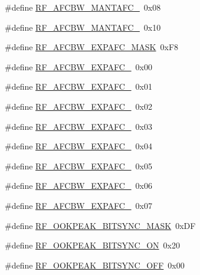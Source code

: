 \begin{DoxyCompactItemize}
\item 
\#define \hyperlink{sx1276Regs-Fsk_8h_aac631ae8fd6d24284d6624ef2c32f0ec}{R\+F\+\_\+\+A\+F\+C\+B\+W\+\_\+\+M\+A\+N\+T\+A\+F\+C\+\_}~0x08
\item 
\#define \hyperlink{sx1276Regs-Fsk_8h_a0fa0fc9612a4b48114ed43fb4e2e95b4}{R\+F\+\_\+\+A\+F\+C\+B\+W\+\_\+\+M\+A\+N\+T\+A\+F\+C\+\_}~0x10
\item 
\#define \hyperlink{sx1276Regs-Fsk_8h_a73aab542bba68b65d6e6e529a6e502c1}{R\+F\+\_\+\+A\+F\+C\+B\+W\+\_\+\+E\+X\+P\+A\+F\+C\+\_\+\+M\+A\+SK}~0x\+F8
\item 
\#define \hyperlink{sx1276Regs-Fsk_8h_a8cc2a4a34787108b59e150f19a27c9a6}{R\+F\+\_\+\+A\+F\+C\+B\+W\+\_\+\+E\+X\+P\+A\+F\+C\+\_}~0x00
\item 
\#define \hyperlink{sx1276Regs-Fsk_8h_afe3cf2aebd859024337d286c1ab68f6a}{R\+F\+\_\+\+A\+F\+C\+B\+W\+\_\+\+E\+X\+P\+A\+F\+C\+\_}~0x01
\item 
\#define \hyperlink{sx1276Regs-Fsk_8h_a7b89d616e4ba9c65441deb101651f638}{R\+F\+\_\+\+A\+F\+C\+B\+W\+\_\+\+E\+X\+P\+A\+F\+C\+\_}~0x02
\item 
\#define \hyperlink{sx1276Regs-Fsk_8h_a93a930a33871216aaa3bc41a8bf2507b}{R\+F\+\_\+\+A\+F\+C\+B\+W\+\_\+\+E\+X\+P\+A\+F\+C\+\_}~0x03
\item 
\#define \hyperlink{sx1276Regs-Fsk_8h_a468c40d81d8271fa92a4331f4c3a6c74}{R\+F\+\_\+\+A\+F\+C\+B\+W\+\_\+\+E\+X\+P\+A\+F\+C\+\_}~0x04
\item 
\#define \hyperlink{sx1276Regs-Fsk_8h_a507cb037026ab04e1a1634a2ef8fa90b}{R\+F\+\_\+\+A\+F\+C\+B\+W\+\_\+\+E\+X\+P\+A\+F\+C\+\_}~0x05
\item 
\#define \hyperlink{sx1276Regs-Fsk_8h_a1ebab24d4f23c9430b1b65b670bf2b79}{R\+F\+\_\+\+A\+F\+C\+B\+W\+\_\+\+E\+X\+P\+A\+F\+C\+\_}~0x06
\item 
\#define \hyperlink{sx1276Regs-Fsk_8h_a99b0f60379ae9cf93b92a8108977cf1d}{R\+F\+\_\+\+A\+F\+C\+B\+W\+\_\+\+E\+X\+P\+A\+F\+C\+\_}~0x07
\item 
\#define \hyperlink{sx1276Regs-Fsk_8h_a07bd216fd11bb1522ddaaec499b1acc6}{R\+F\+\_\+\+O\+O\+K\+P\+E\+A\+K\+\_\+\+B\+I\+T\+S\+Y\+N\+C\+\_\+\+M\+A\+SK}~0x\+DF
\item 
\#define \hyperlink{sx1276Regs-Fsk_8h_a3069cb1326f97de4513e38c42efcf442}{R\+F\+\_\+\+O\+O\+K\+P\+E\+A\+K\+\_\+\+B\+I\+T\+S\+Y\+N\+C\+\_\+\+ON}~0x20
\item 
\#define \hyperlink{sx1276Regs-Fsk_8h_a46e977e1bee2a0285de1c083959c7bbf}{R\+F\+\_\+\+O\+O\+K\+P\+E\+A\+K\+\_\+\+B\+I\+T\+S\+Y\+N\+C\+\_\+\+O\+FF}~0x00

\end{DoxyCompactItemize}
